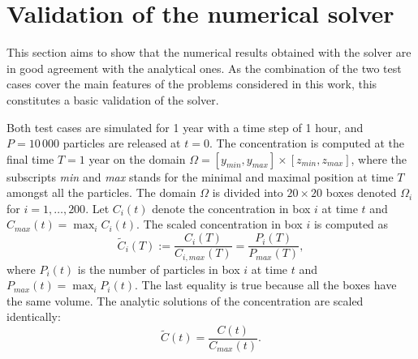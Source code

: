 \section{Validation of the numerical solver}
This section aims to show that the numerical results obtained with the solver are in good agreement with the analytical ones. As the combination of the two test cases cover the main features of the problems considered in this work, this constitutes a basic validation of the solver. 

Both test cases are simulated for 1 year with a time step of 1 hour, and $P = 10\,000$ particles are released at $t=0$.
The concentration is computed at the final time $T = 1$ year on the domain $\Omega = [y_{min},y_{max}] \times [z_{min},z_{max}]$, where the subscripts \textit{min} and \textit{max} stands for the minimal and maximal position at time $T$ amongst all the particles. The domain $\Omega$ is divided into $20 \times 20$ boxes denoted $\Omega_i$ for $i = 1,\dots,200$. Let $C_i(t)$ denote the concentration in box $i$ at time $t$ and $C_{max}(t) = \max_i C_i(t)$. The scaled concentration in box $i$ is computed as
\begin{equation}
	\tilde C_i(T) := \frac{C_i(T)}{C_{i,max}(T)} = \frac{P_i(T)}{P_{max}(T)},
\end{equation}
where $P_i(t)$ is the number of particles in box $i$ at time $t$ and $P_{max}(t) = \max_i P_i(t)$. The last equality is true because all the boxes have the same volume. The analytic solutions of the concentration are scaled identically:
\begin{equation}
	\tilde C(t) = \frac{C(t)}{C_{max}(t)}.
\end{equation}


